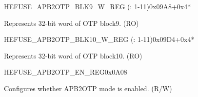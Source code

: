 \begin{register}{H}{EFUSE\_APB2OTP\_BLK9\_W\_REG (: 1-11)}{0x09A8+0x4*}\label{regdesc:EFUSEAPB2OTPBLK9WNREG}
%
\regnewline%
\begin{regdesc}\begin{reglist}
\label{fielddesc:EFUSEAPB2OTPBLOCK9WN}\item [EFUSE\_APB2OTP\_BLOCK9\_W\regindex{n}] Represents 32-bit word  of OTP block9. (RO)
\end{reglist}\end{regdesc}
\end{register}

\begin{register}{H}{EFUSE\_APB2OTP\_BLK10\_W\_REG (: 1-11)}{0x09D4+0x4*}\label{regdesc:EFUSEAPB2OTPBLK10WNREG}
%
\regnewline%
\begin{regdesc}\begin{reglist}
\label{fielddesc:EFUSEAPB2OTPBLOCK10WN}\item [EFUSE\_APB2OTP\_BLOCK10\_W\regindex{n}] Represents 32-bit word  of OTP block10. (RO)
\end{reglist}\end{regdesc}
\end{register}

\begin{register}{H}{EFUSE\_APB2OTP\_EN\_REG}{0x0A08}\label{regdesc:EFUSEAPB2OTPENREG}
%
%
\regnewline%
\begin{regdesc}\begin{reglist}
\label{fielddesc:EFUSEAPB2OTPAPB2OTPEN}\item [EFUSE\_APB2OTP\_APB2OTP\_EN] Configures whether APB2OTP mode is enabled. (R/W)
\end{reglist}\end{regdesc}
\end{register}

